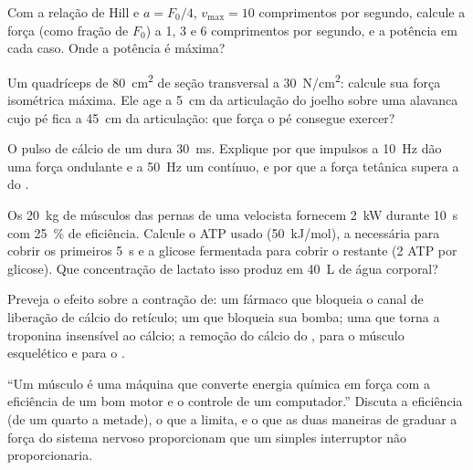 \begin{exercise}[$\star\star$]\label{exo:b2:muscle-movement:7}
Com a relação de Hill e $a = F_0/4$, $v_{\max} = 10$ comprimentos por
segundo, calcule a força (como fração de $F_0$) a 1, 3 e 6 comprimentos
por segundo, e a potência em cada caso. Onde a potência é máxima?
\end{exercise}

\begin{exercise}[$\star\star$]\label{exo:b2:muscle-movement:8}
Um quadríceps de \qty{80}{cm^2} de seção transversal a
\qty{30}{N/cm^2}: calcule sua força isométrica máxima. Ele age a
\qty{5}{cm} da articulação do joelho sobre uma alavanca cujo pé fica a
\qty{45}{cm} da articulação: que força o pé consegue exercer?
\end{exercise}

\begin{exercise}[$\star\star$]\label{exo:b2:muscle-movement:9}
O pulso de cálcio de um  dura \qty{30}{ms}. Explique por que
impulsos a \qty{10}{Hz} dão uma força ondulante e a \qty{50}{Hz} um
 contínuo, e por que a força tetânica supera a do .
\end{exercise}

\begin{exercise}[$\star\star\star$]\label{exo:b2:muscle-movement:10}
Os \qty{20}{kg} de músculos das pernas de uma velocista fornecem
\qty{2}{kW} durante \qty{10}{s} com \qty{25}{\%} de eficiência. Calcule
o ATP usado (\qty{50}{kJ/mol}), a  necessária para cobrir
os primeiros \qty{5}{s} e a glicose fermentada para cobrir o restante
(2 ATP por glicose). Que concentração de lactato isso produz em
\qty{40}{L} de água corporal?
\end{exercise}

\begin{exercise}[$\star\star\star$]\label{exo:b2:muscle-movement:11}
Preveja o efeito sobre a contração de: um fármaco que bloqueia o canal
de liberação de cálcio do retículo; um que bloqueia sua bomba; uma
 que torna a troponina insensível ao cálcio; a remoção do cálcio
do , para o músculo esquelético e para o .
\end{exercise}

\begin{exercise}[$\star\star\star$]\label{exo:b2:muscle-movement:12}
``Um músculo é uma máquina que converte energia química em força com a
eficiência de um bom motor e o controle de um computador.'' Discuta a
eficiência (de um quarto a metade), o que a limita, e o que as duas
maneiras de graduar a força do sistema nervoso proporcionam que um
simples interruptor não proporcionaria.
\end{exercise}

